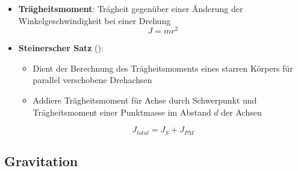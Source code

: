 \begin{itemize}
	\item \textbf{Trägheitsmoment}: Trägheit gegenüber einer Änderung der Winkelgeschwindigkeit bei einer Drehung
	\begin{equation}
		J = mr^2
	\end{equation}
	\item \textbf{Steinerscher Satz} ():
	\begin{itemize}
		\item Dient der Berechnung des Trägheitsmoments eines starren Körpers für parallel verschobene Drehachsen
		\item Addiere Trägheitsmoment für Achse durch Schwerpunkt und Trägheitsmoment einer Punktmasse im Abstand $d$ der Achsen
	\end{itemize}
	\begin{equation}
		J_{total} = J_S + J_{PM}
	\end{equation}
\end{itemize}

\subsection{Gravitation}%
\label{mech:sub:gravitation}

